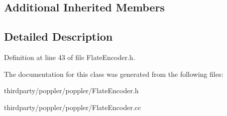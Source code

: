 \subsection*{Additional Inherited Members}


\subsection{Detailed Description}


Definition at line 43 of file Flate\+Encoder.\+h.



The documentation for this class was generated from the following files\+:\begin{DoxyCompactItemize}
\item 
thirdparty/poppler/poppler/Flate\+Encoder.\+h\item 
thirdparty/poppler/poppler/Flate\+Encoder.\+cc\end{DoxyCompactItemize}
